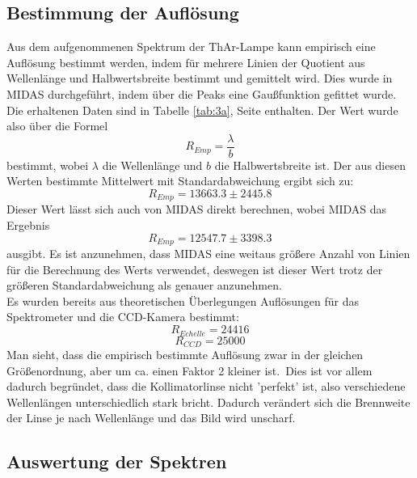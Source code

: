 \subsection{Bestimmung der Auflösung}
Aus dem aufgenommenen Spektrum der ThAr-Lampe kann empirisch eine Auflösung bestimmt werden, indem für mehrere Linien der Quotient aus Wellenlänge und Halbwertsbreite bestimmt und gemittelt wird. Dies wurde in MIDAS durchgeführt, indem über die Peaks eine Gaußfunktion gefittet wurde. Die erhaltenen Daten sind in Tabelle \ref{tab:3a}, Seite  \pageref{tab:3a} enthalten. Der Wert wurde also über die Formel
\begin{equation}
R_{Emp} = \frac{\lambda}{b}
\end{equation}
bestimmt, wobei $\lambda$ die Wellenlänge und $b$ die Halbwertsbreite ist. Der aus diesen Werten bestimmte Mittelwert mit Standardabweichung ergibt sich zu:
\begin{equation}
R_{Emp} = 13663.3 \pm 2445.8
\end{equation}
Dieser Wert lässt sich auch von MIDAS direkt berechnen, wobei MIDAS das Ergebnis
\begin{equation}
R_{Emp} = 12547.7 \pm 3398.3
\end{equation}
ausgibt. Es ist anzunehmen, dass MIDAS eine weitaus größere Anzahl von Linien für die Berechnung des Werts verwendet, deswegen ist dieser Wert trotz der größeren Standardabweichung als genauer anzunehmen.
\\
Es wurden bereits aus theoretischen Überlegungen Auflösungen für das Spektrometer und die CCD-Kamera bestimmt:
\begin{equation}
R_{Echelle} = 24416
\end{equation}
\begin{equation}
R_{CCD} =  25000
\end{equation}
Man sieht, dass die empirisch bestimmte Auflösung zwar in der gleichen Größenordnung, aber um ca. einen Faktor 2 kleiner ist.\
Dies ist vor allem dadurch begründet, dass die Kollimatorlinse nicht 'perfekt' ist, also verschiedene Wellenlängen unterschiedlich stark bricht. Dadurch verändert sich die Brennweite der Linse je nach Wellenlänge und das Bild wird unscharf.

\subsection{Auswertung der Spektren}
